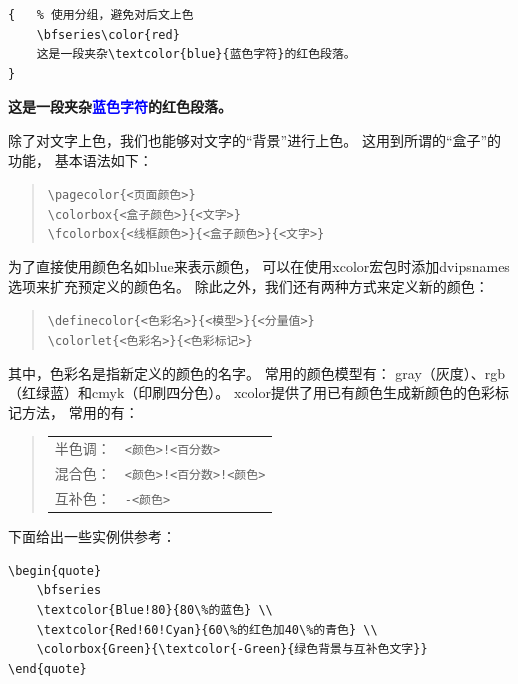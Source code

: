 \documentclass{ctexart}
\numberwithin{equation}{section}			%
\begin{document}
\begin{lstlisting}
{	% 使用分组，避免对后文上色
	\bfseries\color{red}		
	这是一段夹杂\textcolor{blue}{蓝色字符}的红色段落。
}
\end{lstlisting}
	
	{	%
		\bfseries\color{red}		
		这是一段夹杂\textcolor{blue}{蓝色字符}的红色段落。
	}

	除了对文字上色，我们也能够对文字的“背景”进行上色。
	这用到所谓的“盒子”的功能，
	基本语法如下：
	
	\begin{quote}
		\verb|\pagecolor{<页面颜色>}| \\
		\verb|\colorbox{<盒子颜色>}{<文字>}| \\
		\verb|\fcolorbox{<线框颜色>}{<盒子颜色>}{<文字>}|
	\end{quote}
	
	为了直接使用颜色名如blue来表示颜色，
	可以在使用xcolor宏包时添加dvipsnames选项来扩充预定义的颜色名。
	除此之外，我们还有两种方式来定义新的颜色：
	
	\begin{quote}
		\verb|\definecolor{<色彩名>}{<模型>}{<分量值>}| \\
		\verb|\colorlet{<色彩名>}{<色彩标记>}|
	\end{quote}
	
	其中，色彩名是指新定义的颜色的名字。
	常用的颜色模型有：
	gray（灰度）、rgb（红绿蓝）和cmyk（印刷四分色）。
	xcolor提供了用已有颜色生成新颜色的色彩标记方法，
	常用的有：
	
	\begin{quote}
		\begin{tabular}{ll}
			半色调： & \verb|<颜色>!<百分数>| \\
			混合色： & \verb|<颜色>!<百分数>!<颜色>| \\
			互补色： & \verb|-<颜色>| \\
		\end{tabular}
	\end{quote}
	
	下面给出一些实例供参考：
	
\begin{lstlisting}
\begin{quote}
	\bfseries
	\textcolor{Blue!80}{80\%的蓝色} \\
	\textcolor{Red!60!Cyan}{60\%的红色加40\%的青色} \\
	\colorbox{Green}{\textcolor{-Green}{绿色背景与互补色文字}}
\end{quote}
\end{lstlisting}
	
\end{document}
